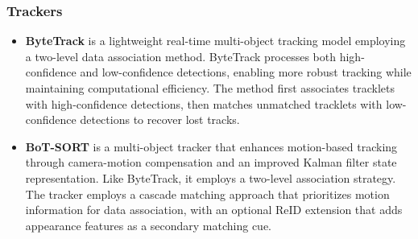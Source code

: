 \subsubsection{Trackers}
\begin{itemize}
     \item \textbf{ByteTrack} \cite{bytetrack} is a lightweight real-time multi-object tracking model employing a two-level data association method. ByteTrack processes both high-confidence and low-confidence detections, enabling more robust tracking while maintaining computational efficiency. The method first associates tracklets with high-confidence detections, then matches unmatched tracklets with low-confidence detections to recover lost tracks. 

    \item \textbf{BoT-SORT} \cite{BoT-SORT} is a multi-object tracker that enhances motion-based tracking through camera-motion compensation and an improved Kalman filter state representation. Like ByteTrack, it employs a two-level association strategy. The tracker employs a cascade matching approach that prioritizes motion information for data association, with an optional ReID extension that adds appearance features as a secondary matching cue.
\end{itemize}



